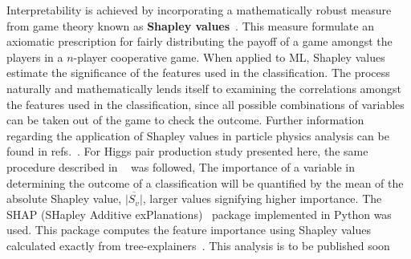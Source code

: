 Interpretability is achieved by incorporating a mathematically robust measure from game theory known as \textbf{Shapley values}~\cite{shapley1951notes}. This measure formulate an axiomatic prescription for fairly distributing the payoff of a game amongst the players in a $n$-player cooperative game. When applied to ML, Shapley values estimate the significance of the features used in the classification. The process naturally and mathematically lends itself to examining the correlations amongst the features used in the classification, since all possible combinations of variables can be taken out of the game to check the outcome. Further information regarding the application of Shapley values in particle physics analysis can be found in refs.~\cite{Grojean:2020ech,Alvestad:2021sje,Cornell:2021gut}.  For Higgs pair production study presented here, the same procedure described in ~\cite{Grojean:2020ech} was followed, The importance of a variable in determining the outcome of a classification will be quantified by the mean of the absolute Shapley value, $\overline{|S_v|}$, larger values signifying higher importance. The SHAP (SHapley Additive exPlanations)~\cite{NIPS2017_7062} package implemented in Python was used. This package computes the feature importance using Shapley values calculated exactly from  tree-explainers~\cite{2018arXiv180203888L,Lundberg:2020vt}. This analysis is to be published soon~\cite{IML}\\
